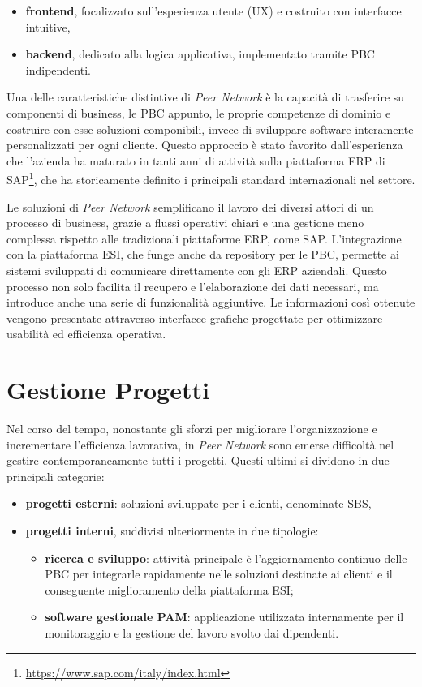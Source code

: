\begin{itemize}
    \item \textbf{frontend}, focalizzato sull’esperienza utente (UX) e costruito con interfacce intuitive,
    \item \textbf{backend}, dedicato alla logica applicativa, implementato tramite \ac{PBC} indipendenti.
\end{itemize}

Una delle caratteristiche distintive di \textit{Peer Network} è la capacità di trasferire su componenti di business, le \ac{PBC} appunto, le proprie
competenze di dominio e costruire con esse soluzioni componibili, invece di sviluppare software interamente personalizzati per ogni cliente.
Questo approccio è stato favorito dall’esperienza che l’azienda ha maturato in tanti anni di attività sulla piattaforma \ac{ERP} di
SAP\footnote{\url{https://www.sap.com/italy/index.html}}, che ha storicamente definito i principali standard internazionali nel settore.

Le soluzioni di \textit{Peer Network} semplificano il lavoro dei diversi attori di un processo di business, grazie a flussi operativi chiari e una
gestione meno complessa rispetto alle tradizionali piattaforme \ac{ERP}, come SAP. L'integrazione con la piattaforma \ac{ESI}, che funge anche da
repository per le \ac{PBC}, permette ai sistemi sviluppati di comunicare direttamente con gli \ac{ERP} aziendali. Questo processo non solo facilita
il recupero e l'elaborazione dei dati necessari, ma introduce anche una serie di funzionalità aggiuntive. Le informazioni così ottenute vengono
presentate attraverso interfacce grafiche progettate per ottimizzare usabilità ed efficienza operativa.

\section{Gestione Progetti}
\label{sec:pm}
Nel corso del tempo, nonostante gli sforzi per migliorare l’organizzazione e incrementare l’efficienza lavorativa, in \textit{Peer Network} sono
emerse difficoltà nel gestire contemporaneamente tutti i progetti. Questi ultimi si dividono in due principali categorie:

\begin{itemize}
    \item \textbf{progetti esterni}: soluzioni sviluppate per i clienti, denominate \ac{SBS},
    \item \textbf{progetti interni}, suddivisi ulteriormente in due tipologie:
        \begin{itemize}
            \item \textbf{ricerca e sviluppo}: attività principale è l'aggiornamento continuo delle \ac{PBC} per integrarle
            rapidamente nelle soluzioni destinate ai clienti e il conseguente miglioramento della piattaforma \ac{ESI};
            \item \textbf{software gestionale \ac{PAM}}: applicazione utilizzata internamente per il monitoraggio e la gestione del lavoro svolto dai dipendenti.
        \end{itemize}
\end{itemize}


